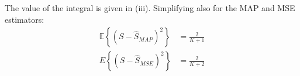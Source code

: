 \begin{solution}[\textcolor{blue}{Solution to problem 2.8}]
\begin{enumerate}[a)]
    
    The value of the integral is given in (iii). Simplifying also for the MAP and MSE estimators:
\begin{align}
\mathbb{E}\left\{ (S-\hat{S}_{MAP})^2\right\} & = \displaystyle\frac{2}{K+1}  \nonumber \\
{E}\left\{(S-\hat{S}_{MSE})^2\right\} & = \displaystyle\frac{2}{K+2}  \nonumber 
\end{align}

\end{enumerate}
\end{solution}





